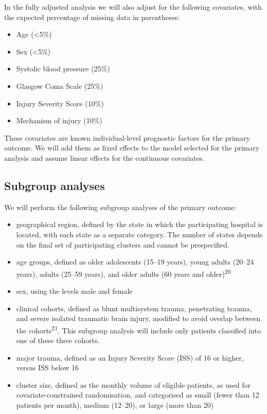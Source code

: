 \documentclass[
]{scrartcl}
\providecommand{\tightlist}{%
  \setlength{\itemsep}{0pt}\setlength{\parskip}{0pt}}\usepackage{longtable,booktabs,array}
\begin{document}
In the fully adjusted analysis we will also adjust for the following
covariates, with the expected percentage of missing data in parentheses:

\begin{itemize}
\tightlist
\item
  Age (\textless5\%)
\item
  Sex (\textless5\%)
\item
  Systolic blood pressure (25\%)
\item
  Glasgow Coma Scale (25\%)
\item
  Injury Severity Score (10\%)
\item
  Mechanism of injury (10\%)
\end{itemize}

These covariates are known individual-level prognostic factors for the
primary outcome. We will add them as fixed effects to the model selected
for the primary analysis and assume linear effects for the continuous
covariates.

\subsection{Subgroup analyses}\label{sec-subgroup-analyses}

We will perform the following subgroup analyses of the primary outcome:

\begin{itemize}
\tightlist
\item
  geographical region, defined by the state in which the participating
  hospital is located, with each state as a separate category. The
  number of states depends on the final set of participating clusters
  and cannot be prespecified.
\item
  age groups, defined as older adolescents (15--19 years), young adults
  (20--24 years), adults (25--59 years), and older adults (60 years and
  older)\textsuperscript{20}
\item
  sex, using the levels male and female
\item
  clinical cohorts, defined as blunt multisystem trauma, penetrating
  trauma, and severe isolated traumatic brain injury, modified to avoid
  overlap between the cohorts\textsuperscript{21}. This subgroup
  analysis will include only patients classified into one of these three
  cohorts.
\item
  major trauma, defined as an Injury Severity Score (ISS) of 16 or
  higher, versus ISS below 16
\item
  cluster size, defined as the monthly volume of eligible patients, as
  used for covariate-constrained randomisation, and categorised as small
  (fewer than 12 patients per month), medium (12--20), or large (more
  than 20)
\end{itemize}
\end{document}
